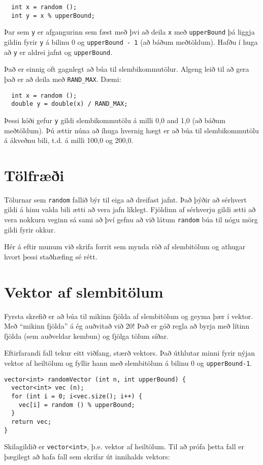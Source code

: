 \begin{verbatim}
  int x = random ();
  int y = x % upperBound;
\end{verbatim}
%
Þar sem {\tt y} er afgangurinn sem fæst með þvi að deila {\tt x} með {\tt upperBound} þá liggja gildin fyrir {\tt y} á bilinu 0 og {\tt upperBound - 1} (að báðum meðtöldum).
Hafðu í huga að {\tt y} er aldrei jafnt og {\tt upperBound}.

Það er einnig oft gagnlegt að búa til slembikommutölur.
Algeng leið til að gera það er að deila með {\tt RAND\_MAX}.
Dæmi:

\begin{verbatim}
  int x = random ();
  double y = double(x) / RAND_MAX;
\end{verbatim}
%
Þessi kóði gefur {\tt y} gildi slembikommutölu á milli 0,0 and 1,0 (að báðum meðtöldum).
Þú ættir núna að íhuga hvernig hægt er að búa til slembikommutölu á ákveðnu bili, t.d. á milli 100,0 og 200,0.

\section{Tölfræði}

Tölurnar sem {\tt random} fallið býr til eiga að dreifast jafnt.
Það þýðir að sérhvert gildi á hinu valda bili ætti að vera jafn líklegt.
Fjöldinn af sérhverju gildi ætti að vera nokkurn veginn sá sami að því gefnu að við látum {\tt random} búa til nógu mörg gildi fyrir okkur.

Hér á eftir munum við skrifa forrit sem mynda röð af slembitölum og athugar hvort þessi staðhæfing sé rétt.

\section{Vektor af slembitölum}

Fyrsta skrefið er að búa til mikinn fjölda af slembitölum og geyma þær í vektor.
Með ``mikinn fjölda'' á ég auðvitað við 20!  
Það er góð regla að byrja með lítinn fjölda (sem auðveldar kembun) og fjölga tölum síðar.

Eftirfarandi fall tekur eitt viðfang, stærð vektors.
Það úthlutar minni fyrir nýjan vektor af heiltölum og fyllir hann með slembitölum á bilinu 0 og {\tt upperBound-1}.

\begin{verbatim}
vector<int> randomVector (int n, int upperBound) {
  vector<int> vec (n);
  for (int i = 0; i<vec.size(); i++) {
    vec[i] = random () % upperBound;
  }
  return vec;
}
\end{verbatim}
%
Skilagildið er {\tt vector<int>}, þ.e. vektor af heiltölum.
Til að prófa þetta fall er þægilegt að hafa fall sem skrifar út innihalds vektors:

